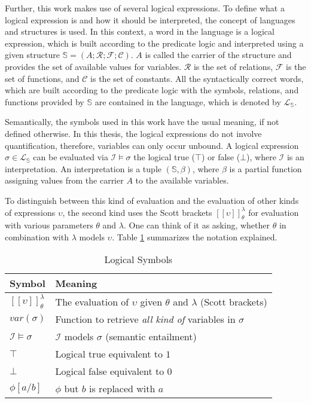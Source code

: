     Further, this work makes use of several logical expressions. To define what a logical expression is and how it should be interpreted, the concept of languages and structures is used. In this context, a word in the language is a logical expression, which is built according to the predicate logic and interpreted using a given structure $\mathbb{S} = (A; \mathcal{R}; \mathcal{F}; \mathcal{C})$. $A$ is called the carrier of the structure and provides the set of available values for variables. $\mathcal{R}$ is the set of relations, $\mathcal{F}$ is the set of functions, and $\mathcal{C}$ is the set of constants. All the syntactically correct words, which are built according to the predicate logic with the symbols, relations, and functions provided by $\mathbb{S}$ are contained in the language, which is denoted by $\mathcal{L}_{\mathbb{S}}$.

    Semantically, the symbols used in this work have the usual meaning, if not defined otherwise. In this thesis, the logical expressions do not involve quantification, therefore, variables can only occur unbound. 
    A logical expression $\sigma \in \mathcal{L}_{\mathbb{S}}$ can be evaluated via $\mathcal{I} \models \sigma$ the logical true ($\top$) or false ($\bot$), where $\mathcal{I}$ is an interpretation. An interpretation is a tuple $(\mathbb{S}, \beta)$, where $\beta$ is a partial function assigning values from the carrier $A$ to the available variables.
    
    To distinguish between this kind of evaluation and the evaluation of other kinds of expressions $\upsilon$, the second kind uses the Scott brackets $[[\upsilon]]_\theta^\lambda$ for evaluation with various parameters $\theta$ and $\lambda$. One can think of it as asking, whether $\theta$ in combination with $\lambda$ models $\upsilon$.
    Table \ref{tab:logical_symbols} summarizes the notation explained.
   
    \begin{table}[h]
        \centering
            \begin{tabular}{l|l}
             \toprule
             Symbol & Meaning\\
             \midrule
             \midrule
             $[[\upsilon]]_\theta^\lambda$ & The evaluation of $\upsilon$ given $\theta$ and $\lambda$ (Scott brackets)\\
             $var(\sigma)$ & Function to retrieve \textit{all kind of} variables in $\sigma$\\
             $\mathcal{I} \models \sigma$ & $\mathcal{I}$ models $\sigma$ (semantic entailment)\\
             $\top$ & Logical true equivalent to $1$\\
             $\bot$ & Logical false equivalent to $0$\\
             $\phi[a / b]$ & $\phi$ but $b$ is replaced with $a$\\
             \bottomrule
        \end{tabular}        
        \caption{Logical Symbols}
        \label{tab:logical_symbols}
    \end{table}
    
